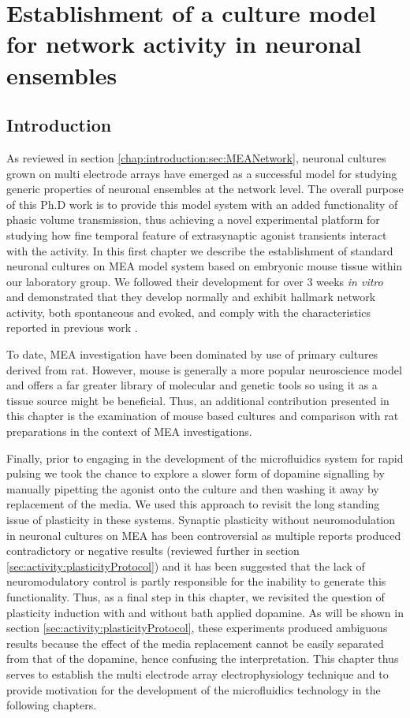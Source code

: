 \chapter{Establishment of a culture model for network activity in neuronal ensembles}
\label{chap:activity}
    \section{Introduction}
      As reviewed in section \ref{chap:introduction:sec:MEANetwork}, neuronal cultures grown on multi electrode arrays have emerged as a successful model for studying generic properties of neuronal ensembles at the network level. The overall purpose of this Ph.D work is to provide this model system with an added functionality of phasic volume transmission, thus achieving a novel experimental platform for studying how fine temporal feature of extrasynaptic agonist transients interact with the activity. In this first chapter we describe the establishment of standard neuronal cultures on MEA model system based on embryonic mouse tissue within our laboratory group. We followed their development for over 3 weeks \textit{in vitro} and demonstrated that they develop normally and exhibit hallmark network activity, both spontaneous and evoked, and comply with the characteristics reported in previous work \cite{chiappalone2006dissociated,wagenaar2006extremely,van2004longterm,breskin2006percolation,penn2016network}.

        To date, MEA investigation have been dominated by use of primary cultures derived from rat. However, mouse is generally a more popular neuroscience model and offers a far greater library of molecular and genetic tools so using it as a tissue source might be beneficial. Thus, an additional contribution presented in this chapter is the examination of mouse based cultures and comparison with rat preparations in the context of MEA investigations. 

        Finally, prior to engaging in the development of the microfluidics system for rapid pulsing we took the chance to explore a slower form of dopamine signalling by manually pipetting the agonist onto the culture and then washing it away by replacement of the media. We used this approach to revisit the long standing issue of plasticity in these systems. Synaptic plasticity without neuromodulation in neuronal cultures on MEA has been controversial as multiple reports produced contradictory or negative results (reviewed further in section \ref{sec:activity:plasticityProtocol}) and it has been suggested that the lack of neuromodulatory control is partly responsible for the inability to generate this functionality. Thus, as a final step in this chapter, we revisited the question of plasticity induction with and without bath applied dopamine. As will be shown in section \ref{sec:activity:plasticityProtocol}, these experiments produced ambiguous results because the effect of the media replacement cannot be easily separated from that of the dopamine, hence confusing the interpretation. This chapter thus serves to establish the multi electrode array electrophysiology technique and to provide motivation for the development of the microfluidics technology in the following chapters.
        	
